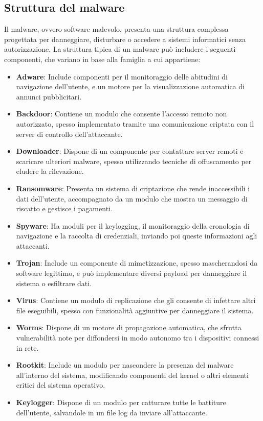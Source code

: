 \subsection{Struttura del malware}
Il malware, ovvero software malevolo, presenta una struttura complessa progettata per danneggiare, disturbare o accedere a sistemi informatici senza autorizzazione. La struttura tipica di un malware può includere i seguenti componenti, che variano in base alla famiglia a cui appartiene:
\begin{itemize}
    \item \textbf{Adware}: Include componenti per il monitoraggio delle abitudini di navigazione dell'utente, e un motore per la visualizzazione automatica di annunci pubblicitari.
    \item \textbf{Backdoor}: Contiene un modulo che consente l'accesso remoto non autorizzato, spesso implementato tramite una comunicazione criptata con il server di controllo dell'attaccante.
    \item \textbf{Downloader}: Dispone di un componente per contattare server remoti e scaricare ulteriori malware, spesso utilizzando tecniche di offuscamento per eludere la rilevazione.
    \item \textbf{Ransomware}: Presenta un sistema di criptazione che rende inaccessibili i dati dell'utente, accompagnato da un modulo che mostra un messaggio di riscatto e gestisce i pagamenti.
    \item \textbf{Spyware}: Ha moduli per il keylogging, il monitoraggio della cronologia di navigazione e la raccolta di credenziali, inviando poi queste informazioni agli attaccanti.
    \item \textbf{Trojan}: Include un componente di mimetizzazione, spesso mascherandosi da software legittimo, e può implementare diversi payload per danneggiare il sistema o esfiltrare dati.
    \item \textbf{Virus}: Contiene un modulo di replicazione che gli consente di infettare altri file eseguibili, spesso con funzionalità aggiuntive per danneggiare il sistema.
    \item \textbf{Worms}: Dispone di un motore di propagazione automatica, che sfrutta vulnerabilità note per diffondersi in modo autonomo tra i dispositivi connessi in rete.
    \item \textbf{Rootkit}: Include un modulo per nascondere la presenza del malware all'interno del sistema, modificando componenti del kernel o altri elementi critici del sistema operativo.
    \item \textbf{Keylogger}: Dispone di un modulo per catturare tutte le battiture dell'utente, salvandole in un file log da inviare all'attaccante.

\end{itemize}
